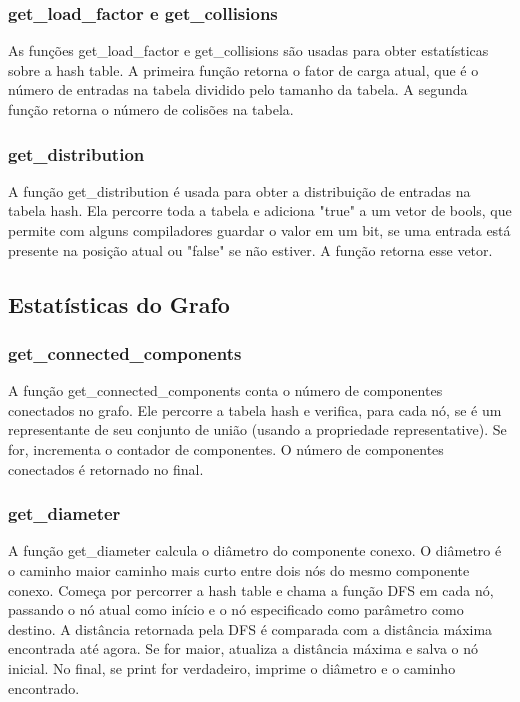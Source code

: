 \documentclass[a4paper,11pt]{article}
\begin{document}
    \subsubsection{get\_load\_factor e get\_collisions}
   As funções get\_load\_factor e get\_collisions são usadas para obter estatísticas sobre a hash table. A primeira função retorna o fator de carga atual, que é o número de entradas na tabela dividido pelo tamanho da tabela. A segunda função retorna o número de colisões na tabela.
    
    \subsubsection{get\_distribution}
    A função get\_distribution é usada para obter a distribuição de entradas na tabela hash. Ela percorre toda a tabela e adiciona "true" a um vetor de bools, que permite com alguns compiladores guardar o valor em um bit, se uma entrada está presente na posição atual ou "false" se não estiver. A função retorna esse vetor.
    
    \subsection{Estatísticas do Grafo}\label{subsec:estatisticas-do-grafo}
    
    \subsubsection{get\_connected\_components}
    A função get\_connected\_components conta o número de componentes conectados no grafo. Ele percorre a tabela hash e verifica, para cada nó, se é um representante de seu conjunto de união (usando a propriedade representative). Se for, incrementa o contador de componentes. O número de componentes conectados é retornado no final.
    
    \subsubsection{get\_diameter}
    A função get\_diameter calcula o diâmetro do componente conexo. O diâmetro é o caminho maior caminho mais curto entre dois nós do mesmo componente conexo. Começa por percorrer a hash table e chama a função DFS em cada nó, passando o nó atual como início e o nó especificado como parâmetro como destino. A distância retornada pela DFS é comparada com a distância máxima encontrada até agora. Se for maior, atualiza a distância máxima e salva o nó inicial. No final, se print for verdadeiro, imprime o diâmetro e o caminho encontrado.
    
\end{document}
